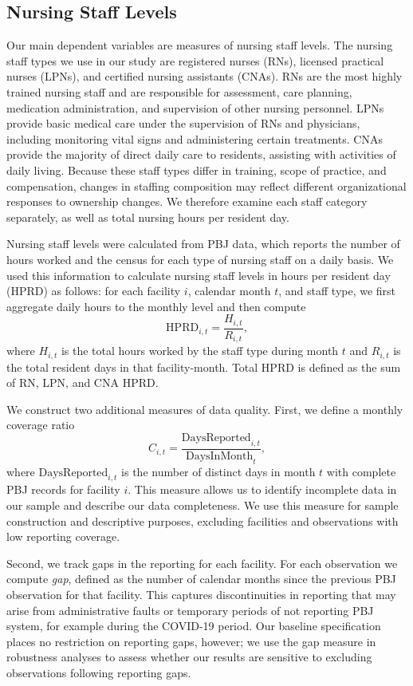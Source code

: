 \documentclass[12pt]{article}
\begin{document}
\subsection{Nursing Staff Levels}

Our main dependent variables are measures of nursing staff levels. The nursing staff types we use in our study are registered nurses (RNs), licensed practical nurses (LPNs), and certified nursing assistants (CNAs). RNs are the most highly trained nursing staff and are responsible for assessment, care planning, medication administration, and supervision of other nursing personnel. LPNs provide basic medical care under the supervision of RNs and physicians, including monitoring vital signs and administering certain treatments. CNAs provide the majority of direct daily care to residents, assisting with activities of daily living. Because these staff types differ in training, scope of practice, and compensation, changes in staffing composition may reflect different organizational responses to ownership changes. We therefore examine each staff category separately, as well as total nursing hours per resident day. 

Nursing staff levels were calculated from PBJ data, which reports the number of hours worked and the census for each type of nursing staff on a daily basis. We used this information to calculate nursing staff levels in hours per resident day (HPRD) as follows: for each facility $i$, calendar month $t$, and staff type, we first aggregate daily hours to the monthly level and then compute
\begin{equation}
  \text{HPRD}_{i,t} = \frac{H_{i,t}}{R_{i,t}},
\end{equation}
where $H_{i,t}$ is the total hours worked by the staff type during month $t$ and $R_{i,t}$ is the total resident days in that facility-month. Total HPRD is defined as the sum of RN, LPN, and CNA HPRD.

We construct two additional measures of data quality. First, we define a monthly coverage ratio
\[
  C_{i,t} = \frac{\text{DaysReported}_{i,t}}{\text{DaysInMonth}_t},
\]
where $\text{DaysReported}_{i,t}$ is the number of distinct days in month $t$ with complete PBJ records for facility $i$. This measure allows us to identify incomplete data in our sample and describe our data completeness. We use this measure for sample construction and descriptive purposes, excluding facilities and observations with low reporting coverage.

Second, we track gaps in the reporting for each facility. For each observation we compute \textit{gap}, defined as the number of calendar months since the previous PBJ observation for that facility. This captures discontinuities in reporting that may arise from administrative faults or temporary periods of not reporting PBJ system, for example during the COVID-19 period. Our baseline specification places no restriction on reporting gaps, however; we use the gap measure in robustness analyses to assess whether our results are sensitive to excluding observations following reporting gaps.
\end{document}
